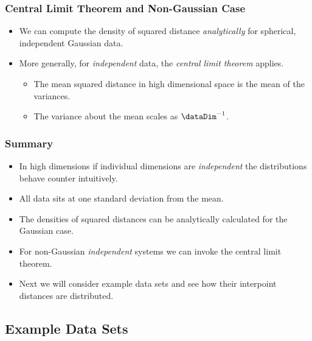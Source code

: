 \begin{frame}
  \frametitle{Central Limit Theorem and Non-Gaussian Case}
  \begin{itemize}
  \item <1->We can compute the density of squared distance \emph{analytically}
    for spherical, independent Gaussian data.
  \item <2->More generally, for \emph{independent} data, the \emph{central
      limit theorem} applies.
    
    \begin{itemize}
    \item <3->The mean squared distance in high dimensional space is the mean
      of the variances.
    \item <4->The variance about the mean scales as $\dataDim^{-1}$.
    \end{itemize}
  \end{itemize}

\end{frame}

\begin{frame}
  \frametitle{Summary}
  \begin{itemize}
  \item In high dimensions if individual dimensions are \emph{independent}
    the distributions behave counter intuitively.
  \item All data sits at one standard deviation from the mean.
  \item The densities of squared distances can be analytically
    calculated for the Gaussian case.
  \item For non-Gaussian \emph{independent} systems we can invoke the central
    limit theorem.
  \item Next we will consider example data sets and see how their interpoint
    distances are distributed.
  \end{itemize}

\end{frame}

\subsection{Example Data Sets}

